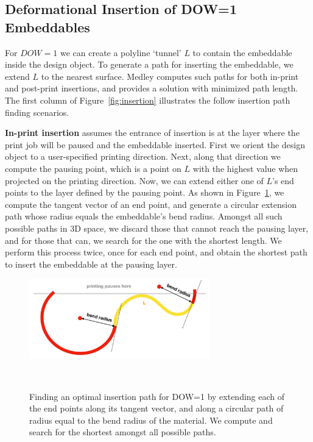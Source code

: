 \subsection{Deformational Insertion of DOW=1 Embeddables}
For $DOW=1$ we can create a polyline `tunnel' $L$ to contain the embeddable inside the design object. To generate a path for inserting the embeddable, we extend $L$ to the nearest surface. Medley computes such paths for both in-print and post-print insertions, and provides a solution with minimized path length. The first column of Figure~\ref{fig:insertion} illustrates the follow insertion path finding scenarios.

\textbf{In-print insertion} assumes the entrance of insertion is at the layer where the print job will be paused and the embeddable inserted. First we orient the design object to a user-specified printing direction. Next, along that direction we compute the pausing point, which is a point on $L$ with the highest value when projected on the printing direction. Now, we can extend either one of $L$'s end points to the layer defined by the pausing point. As shown in Figure~\ref{fig:dow1_insertion}, we compute the tangent vector of an end point, and generate a circular extension path whose radius equals the embeddable's bend radius. Amongst all such possible paths in 3D space, we discard those that cannot reach the pausing layer, and for those that can, we search for the one with the shortest length. We perform this process twice, once for each end point, and obtain the shortest path to insert the embeddable at the pausing layer.

\begin{figure} [h]
  \centering
  \includegraphics[width=0.7\textwidth]{figures/dow1_insertion}
  \caption{Finding an optimal insertion path for DOW=1 by extending each of the end points along its tangent vector, and along a circular path of radius equal to the bend radius of the material. We compute and search for the shortest amongst all possible paths.}~\label{fig:dow1_insertion}
\end{figure}

